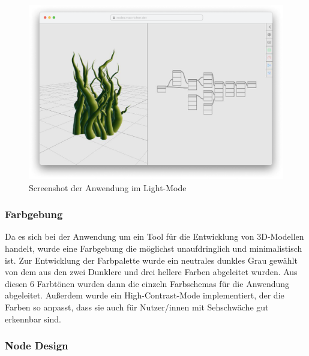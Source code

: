 \documentclass[ngerman]{article}
\begin{document}
\begin{figure}[hbtp]
  \centering
  \includegraphics[width=1\textwidth]{graphics/layout_light.pdf}
  \caption{Screenshot der Anwendung im Light-Mode}
  \label{fig:screenshot_nodarium}
\end{figure}

\pagebreak

\subsubsection{Farbgebung}

Da es sich bei der Anwendung um ein Tool für die Entwicklung von 3D-Modellen handelt, wurde eine Farbgebung die möglichst unaufdringlich und minimalistisch ist.
Zur Entwicklung der Farbpalette wurde ein neutrales dunkles Grau gewählt von dem aus den zwei Dunklere und drei hellere Farben abgeleitet wurden. Aus diesen 6 Farbtönen wurden dann die einzeln Farbschemas für die Anwendung abgeleitet. Außerdem wurde ein High-Contrast-Mode implementiert, der die Farben so anpasst, dass sie auch für Nutzer/innen mit Sehschwäche gut erkennbar sind.

\subsubsection{Node Design}
\end{document}
